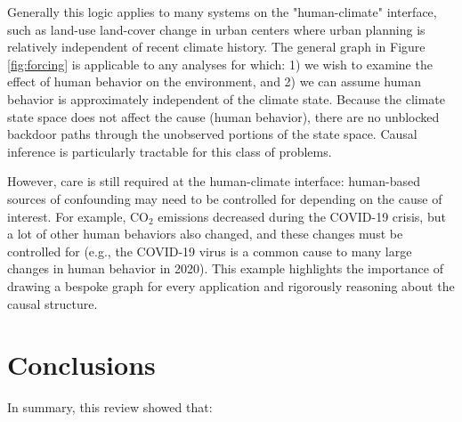 \documentclass[12pt]{article}
\begin{document}
Generally this logic applies to many systems on the "human-climate"
interface, such as land-use land-cover change in urban centers where
urban planning is relatively independent of recent climate
history. The general graph in Figure \ref{fig:forcing} is applicable
to any analyses for which: 1) we wish to examine the effect of human
behavior on the environment, and 2) we can assume human behavior is
approximately independent of the climate state. Because the climate
state space does not affect the cause (human behavior), there are no
unblocked backdoor paths through the unobserved portions of the state
space. Causal inference is particularly tractable for this class of
problems.

However, care is still required at the human-climate interface:
human-based sources of confounding may need to be controlled for
depending on the cause of interest. For example, CO$_2$ emissions
decreased during the COVID-19 crisis, but a lot of other human
behaviors also changed, and these changes must be controlled for
(e.g., the COVID-19 virus is a common cause to many large changes in
human behavior in 2020). This example highlights the importance of
drawing a bespoke graph for every application and rigorously reasoning
about the causal structure.

\section{Conclusions}

In summary, this review showed that:
\end{document}
